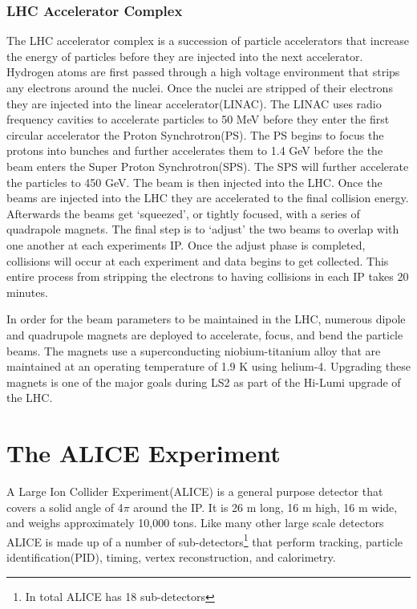 \subsubsection{LHC Accelerator Complex}\label{sec:LHCop}
The LHC accelerator complex is a succession of particle accelerators that increase the energy of particles before they are injected into the next accelerator.  Hydrogen atoms are first passed through a high voltage environment that strips any electrons around the nuclei.  Once the nuclei are stripped of their electrons they are injected into the linear accelerator(LINAC).  The LINAC uses radio frequency cavities to accelerate particles to 50 MeV before they enter the first circular accelerator the Proton Synchrotron(PS).  The PS begins to focus the protons into bunches and further accelerates them to 1.4 GeV before the the beam enters the Super Proton Synchrotron(SPS).  The SPS will further accelerate the particles to 450 GeV.  The beam is then injected into the LHC.  Once the beams are injected into the LHC they are accelerated to the final collision energy.  Afterwards the beams get `squeezed', or tightly focused, with a series of quadrapole magnets.  The final step is to `adjust'  the two beams to overlap with one another at each experiments IP.  Once the adjust phase is completed, collisions will occur at each experiment and data begins to get collected.  This entire process from stripping the electrons to having collisions in each IP takes 20 minutes.

In order for the beam parameters to be maintained in the LHC, numerous dipole and quadrupole magnets are deployed to accelerate, focus, and bend the particle beams.  The magnets use a superconducting niobium-titanium alloy that are maintained at an operating temperature of 1.9 K using helium-4.  Upgrading these magnets is one of the major goals during LS2 as part of the Hi-Lumi upgrade of the LHC\cite{Fabjan:2011jb}.


\section{The ALICE Experiment}
A Large Ion Collider Experiment(ALICE) is a general purpose detector that covers a solid angle of 4$ \pi$ around the IP.  It is 26 m long, 16 m high, 16 m wide, and weighs approximately 10,000 tons\cite{Fabjan:2011jb}.  Like many other large scale detectors ALICE is made up of a number of sub-detectors\footnote{In total ALICE has 18 sub-detectors} that perform tracking, particle identification(PID), timing, vertex reconstruction, and calorimetry.  

